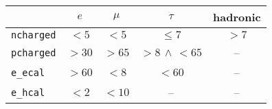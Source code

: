 \begin{tabular}{lcccc}
	\toprule
	 & $e$ & $\mu$ & $\tau$ & hadronic \\
	 \midrule
	\texttt{ncharged} & $<5$  & $<5$  & $\leq 7$ & $>7$ \\
	\texttt{pcharged} & $>30$ & $>65$ & $>8\,\land\,<65$ & --\\
	\texttt{e\_ecal}  & $>60$ & $<8$  & $<60$ & -- \\
	\texttt{e\_hcal}  & $<2$  & $<10$ & -- & -- \\
	\bottomrule
\end{tabular}